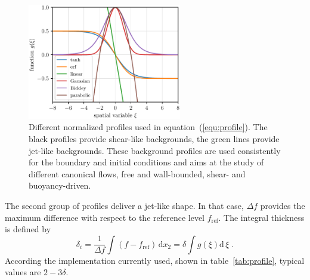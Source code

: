 \begin{figure}
\includegraphics[clip,width=0.6\textwidth]{figs/profiles1}
\caption{Different normalized profiles used in equation~(\ref{equ:profile}). The
  black profiles provide shear-like backgrounds, the green lines provide
  jet-like backgrounds. These background profiles are used consistently for the
  boundary and initial conditions and aims at the study of different canonical
  flows, free and wall-bounded, shear- and buoyancy-driven.}\label{fig:profile}
\end{figure}

The second group of profiles deliver a jet-like shape. In that case, $\Delta f$
provides the maximum difference with respect to the reference level
$f_\text{ref}$. The integral thickness is defined by
\begin{equation}
  \delta_i =\frac{1}{\Delta f}\int\! (f-f_\text{ref})\,\mathrm{d} x_2
  = \delta\int\! g(\xi)\mathrm{d}\,\xi \;.
\label{equ:deltai}
\end{equation}
According the implementation currently used, shown in table~\ref{tab:profile},
typical values are $2-3\delta$.

